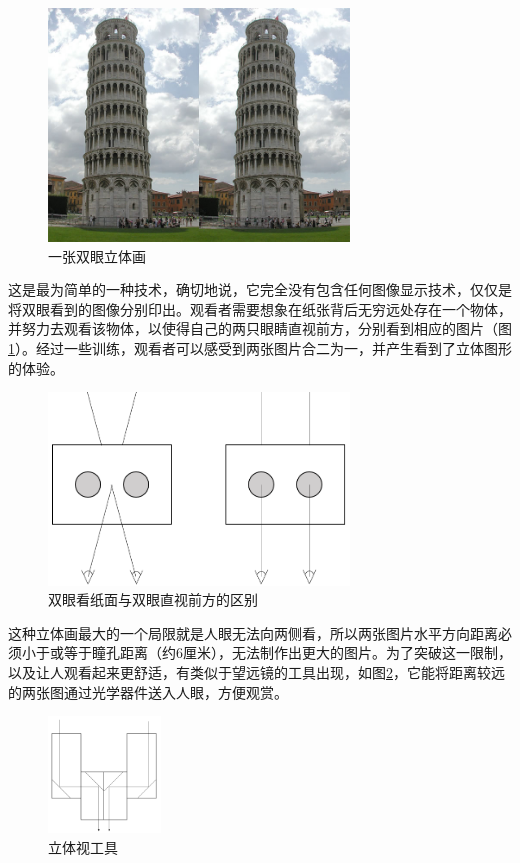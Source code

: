 \documentclass[a4paper, 11pt]{article}
\begin{document}
\begin{CJK}{UTF8}{gbsn}
\begin{figure}[h!]
  \centerline{\includegraphics[width=8cm]{1.jpg}}
  \caption{一张双眼立体画}
\end{figure}

这是最为简单的一种技术，确切地说，它完全没有包含任何图像显示技术，仅仅是将双眼看到的图像分别印出。观看者需要想象在纸张背后无穷远处存在一个物体，并努力去观看该物体，以使得自己的两只眼睛直视前方，分别看到相应的图片（图\ref{fig2}）。经过一些训练，观看者可以感受到两张图片合二为一，并产生看到了立体图形的体验。
\begin{figure}[h!]
  \centerline{\includegraphics[width=8cm]{2.png}}
  \caption{双眼看纸面与双眼直视前方的区别}
  \label{fig2}
\end{figure}

这种立体画最大的一个局限就是人眼无法向两侧看，所以两张图片水平方向距离必须小于或等于瞳孔距离（约6厘米），无法制作出更大的图片。为了突破这一限制，以及让人观看起来更舒适，有类似于望远镜的工具出现，如图\ref{fig3}，它能将距离较远的两张图通过光学器件送入人眼，方便观赏。
\begin{figure}[h!]
  \centerline{\includegraphics[width=3cm]{3.png}}
  \caption{立体视工具}
  \label{fig3}
\end{figure}


\end{CJK}
\end{document}
